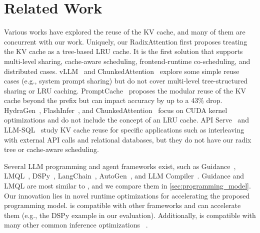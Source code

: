 \section{Related Work}
\label{sec:related-work}
Various works have explored the reuse of the KV cache, and many of them are concurrent with our work. Uniquely, our RadixAttention first proposes treating the KV cache as a tree-based LRU cache. It is the first solution that supports multi-level sharing, cache-aware scheduling, frontend-runtime co-scheduling, and distributed cases.
vLLM~\cite{kwon2023vllm} and ChunkedAttention~\cite{ye2024chunkattention} explore some simple reuse cases (e.g., system prompt sharing) but do not cover multi-level tree-structured sharing or LRU caching. PromptCache~\cite{gim2023prompt} proposes the modular reuse of the KV cache beyond the prefix but can impact accuracy by up to a 43\% drop. HydraGen~\cite{juravsky2024hydragen}, FlashInfer~\cite{flashinfer}, and ChunkedAttention~\cite{ye2024chunkattention} focus on CUDA kernel optimizations and do not include the concept of an LRU cache. API Serve~\cite{abhyankar2024apiserve} and LLM-SQL~\cite{liu2024optimizing} study KV cache reuse for specific applications such as interleaving with external API calls and relational databases, but they do not have our radix tree or cache-aware scheduling.

Several LLM programming and agent frameworks exist, such as Guidance~\cite{guidance}, LMQL~\cite{beurer2023lmql}, DSPy~\cite{khattab2023dspy}, LangChain~\cite{langchain}, AutoGen~\cite{wu2023autogen}, and LLM Compiler~\cite{kim2023llm}. Guidance and LMQL are most similar to \lang, and we compare them in \autoref{sec:programming_model}. Our innovation lies in novel runtime optimizations for accelerating the proposed programming model. \lang is compatible with other frameworks and can accelerate them (e.g., the DSPy example in our evaluation). Additionally, \lang is compatible with many other common inference optimizations ~\cite{yu2022orca, pope2023efficiently, aminabadi2022deepspeed, kwon2023vllm, flashinfer, dao2022flashattention, lin2023awq, hooper2024kvquant, kang2024gear, liu2024kivi, liu2024scissorhands, ge2023model}.

